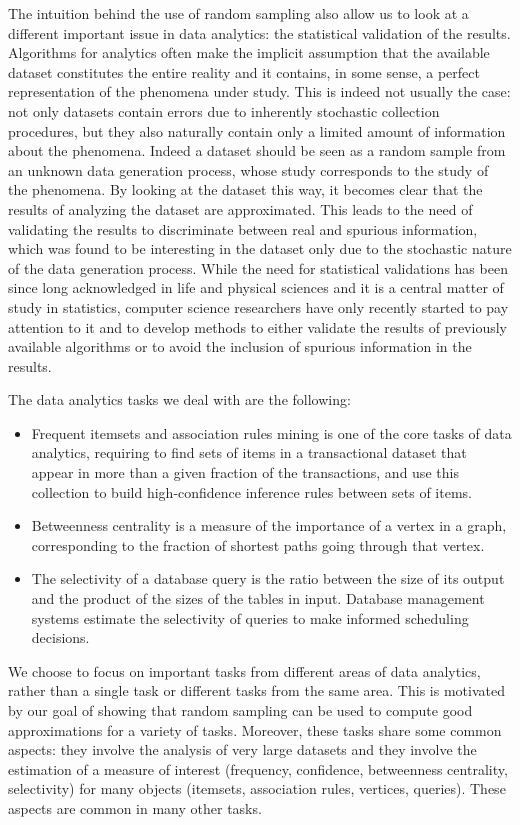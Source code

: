 The intuition behind the use of random sampling also allow us to look at a
different important issue in data analytics: the statistical validation of the
results. Algorithms for analytics often make the implicit assumption that the
available dataset constitutes the entire reality and it contains, in some sense,
a perfect representation of the phenomena under study. This is indeed not
usually the case: not only datasets contain errors due to inherently stochastic
collection procedures, but they also naturally contain only a limited amount of
information about the phenomena. Indeed a dataset should be seen as a random
sample from an unknown data generation process, whose study corresponds to the
study of the phenomena. By looking at the dataset this way, it becomes clear
that the results of analyzing the dataset are approximated. This leads to the
need of validating the results to discriminate between real and spurious
information, which was found to be interesting in the dataset only due to the
stochastic nature of the data generation process. While the need for statistical
validations has been since long acknowledged in life and physical sciences
and it is a central matter of study in statistics, computer science researchers
have only recently started to pay attention to it and to develop methods to 
either validate the results of previously available algorithms or to avoid the
inclusion of spurious information in the results.

The data analytics tasks we deal with are the following:
\begin{itemize}
  \item Frequent itemsets and association rules mining is one of the core tasks
    of data analytics, requiring to find sets of items in a transactional
    dataset that appear in more than a given fraction of the transactions, and
    use this collection to build high-confidence inference rules between sets of
    items.
  \item Betweenness centrality is a measure of the importance of a vertex in a
    graph, corresponding to the fraction of shortest paths going through that
    vertex. 
  \item The selectivity of a database query is the ratio between the size of its
    output and the product of the sizes of the tables in input. Database
    management systems estimate the selectivity of queries to make informed
    scheduling decisions.
\end{itemize}
We choose to focus on important tasks from different areas of data analytics,
rather than a single task or different tasks from the same area. This is
motivated by our goal of showing that random sampling can be used to compute
good approximations for a variety of tasks. Moreover, these tasks share some
common aspects: they involve the analysis of very large datasets and they
involve the estimation of a measure of interest (frequency, confidence,
betweenness centrality, selectivity) for many objects (itemsets, association
rules, vertices, queries). These aspects are common in many other tasks.

